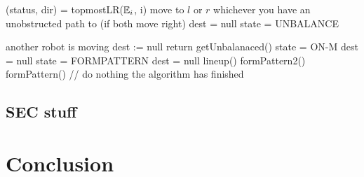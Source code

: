 \documentclass[preprint,10pt]{elsarticle}
\begin{document}
	\begin{algorithm}
	\begin{algorithmic}[1]

				\State (status, dir) = topmostLR($\mathbb{E}_i$, i)
					\State move to $l$ or $r$ whichever you have an unobstructed path to (if both move right)
				\Else
					\State dest = null
				\EndIf
					\State state = UNBALANCE
				\EndIf
			\EndCase

				 \Comment another robot is moving
					\State dest := null
					\State return
				\EndIf
					\State getUnbalanaced()
					\State state = ON-M
					\State dest = null
				\Else
					\State state = FORMPATTERN
					\State dest = null
				\EndIf
			\EndCase
				\State lineup()
				\State formPattern2()
			\EndCase
				\State formPattern()
			\EndCase
				\State // do nothing the algorithm has finished
			\EndCase
		\EndSwitch

	\EndProcedure
	\end{algorithmic}
	\end{algorithm}
	
	

		


	



%

\subsection{SEC stuff } 

\section{Conclusion}
\label{}

\end{document}
